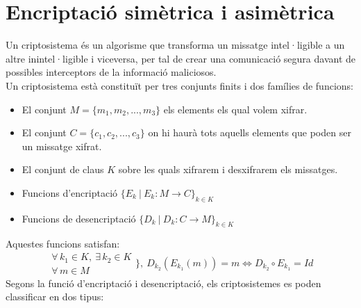 \documentclass{article}
\begin{document}
\section{Encriptació simètrica i asimètrica}
Un criptosistema és un algorisme que transforma un
missatge intel·ligible a un altre inintel·ligible i
viceversa, per tal de crear una comunicació segura davant de possibles interceptors de la informació maliciosos.
\\
Un criptosistema està constituït per tres conjunts finits i dos famílies de funcions:
\begin{itemize}
	\item El conjunt $M = \{m_1, m_2, ..., m_3\}$ els elements els qual volem xifrar.
	\item El conjunt $C = \{c_1, c_2, ..., c_3\}$ on hi haurà tots aquells elements que poden ser un missatge xifrat.
	\item El conjunt de claus $K$ sobre les quals xifrarem i desxifrarem els missatges.
	\item Funcions d'encriptació $\{E_k \ | \ E_k : M \rightarrow C \}_{k \in K} $
	\item Funcions de desencriptació $\{D_k \ | \ D_k : C \rightarrow M \}_{k \in K}$
\end{itemize}
Aquestes funcions satisfan:
\[ \begin{array}{l}
	\forall \, k_1 \in K, \ \exists \, k_2 \in K\\
	\forall \, m \in M
\end{array} \Bigg\}, \ D_{k_2}(E_{k_1}(m)) = m \Longleftrightarrow D_{k_2} \circ E_{k_1} =  Id\]
Segons la funció d'encriptació i desencriptació, els criptosistemes es poden classificar en dos tipus:
\end{document}
